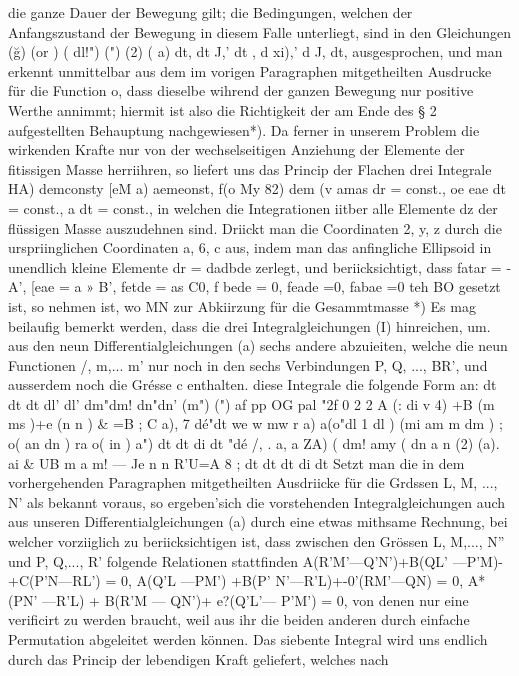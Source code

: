 \documentclass[11pt]{article}
\begin{document}
die ganze Dauer der Bewegung gilt; die Bedingungen, welchen der Anfangszustand der
Bewegung in diesem Falle unterliegt, sind in den Gleichungen (ğ) (or ) ( dl!") (") (2) ( a)
dt, dt J,’ dt , d
xi),’ d J, dt, ausgesprochen, und man erkennt unmittelbar aus dem im vorigen Paragraphen mitgetheilten Ausdrucke für die Function o, dass dieselbe wihrend der ganzen
Bewegung nur positive Werthe annimmt; hiermit ist also die Richtigkeit der am Ende
des § 2 aufgestellten Behauptung nachgewiesen*). Da ferner in unserem Problem die wirkenden Krafte nur von der wechselseitigen Anziehung der Elemente der fitissigen Masse
herriihren, so liefert uns das Princip der Flachen drei Integrale HA) demconsty [eM a)
aemeonst, f(o My 82) dem (v amas dr = const., oe eae dt = const., a dt = const., in
welchen die Integrationen iitber alle Elemente dz der flüssigen Masse auszudehnen sind.
Driickt man die Coordinaten 2, y, z durch die urspriinglichen Coordinaten a, 6, c aus, indem man das anfingliche Ellipsoid in unendlich kleine Elemente dr = dadbde zerlegt, und
beriicksichtigt, dass fatar = -A’, [eae = a » B’, fetde = as C0, f bede = 0, feade =0, fabae
=0 teh BO gesetzt ist, so nehmen ist, wo MN zur Abkiirzung für die Gesammtmasse *) Es
mag beilaufig bemerkt werden, dass die drei Integralgleichungen (I) hinreichen, um. aus
den neun Differentialgleichungen (a) sechs andere abzuieiten, welche die neun Functionen
/, m,... m’ nur noch in den sechs Verbindungen P, Q, ..., BR’, und ausserdem noch die
Grésse c enthalten.
diese Integrale die folgende Form an: dt dt dt dl’ dl’ dm"dm! dn"dn’ (m") (") af pp
OG pal "2f 0 2 2 A (: di v 4) +B (m ms )+e (n n ) \& =B ; C a), 7 dé"dt we w mw r
a) a(o"dl 1 dl ) (mi am m dm ) ; o( an dn ) ra o( in ) a") dt dt di dt "dé /, . a, a ZA)
( dm! amy ( dn a n (2) (a). ai \& UB m a m! — Je n n R’U=A 8 ; dt dt dt di dt Setzt
man die in dem vorhergehenden Paragraphen mitgetheilten Ausdriicke für die Grdssen
L, M, ..., N’ als bekannt voraus, so ergeben’sich die vorstehenden Integralgleichungen
auch aus unseren Differentialgleichungen (a) durch eine etwas mithsame Rechnung, bei
welcher vorziiglich zu beriicksichtigen ist, dass zwischen den Grössen L, M,..., N” und P,
Q,..., R’ folgende Relationen stattfinden A(R’M’—Q’N’)+B(QL’ —P’M)-+C(P’N—RL’)
= 0, A(Q’L —PM’) +B(P’ N’—R’L)+-0’(RM’—QN) = 0, A*(PN’ —R’L) + B(R’M —
QN’)+ e?(Q’L’— P’M’) = 0, von denen nur eine verificirt zu werden braucht, weil aus ihr
die beiden anderen durch einfache Permutation abgeleitet werden können. Das siebente
Integral wird uns endlich durch das Princip der lebendigen Kraft geliefert, welches nach
\end{document}
